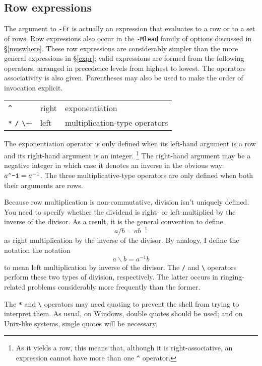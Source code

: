\documentclass[a4paper,11pt,oneside]{book}
\newcommand{\sref}[1]{\hyperref[#1]{\S\ref{#1}}}
\begin{document}
\subsection{Row expressions}\label{rowexpr}

The argument to \verb+-Fr+ is actually an expression%
 that evaluates to a row
or to a set of rows.  Row expressions also occur in the \verb+-Mlead+
family of options discussed in \sref{muswhere}.
These row expressions are considerably simpler than the more general 
expressions in \sref{expr}; 
valid expressions are formed from the following operators, 
arranged in precedence levels from 
highest to lowest.  The operators associativity
is also given.  Parentheses may also be used to make the order of invocation
explicit.

\begin{tabular}{l@{\quad}l@{\quad}l}
\verb+^+&                   right& exponentiation\\
\verb+*+ \verb+/+ \verb+\+& left&  multiplication-type operators\\
\end{tabular}

The exponentiation operator is only defined when its 
left-hand argument is a row and its right-hand argument is an integer.%
\footnote{As it yields a row, this means that, although it is 
right-associative, an expression cannot have more than one \verb+^+ operator.}
The right-hand argument may be a negative integer in which case it denotes
an inverse in the obvious way: $\hbox{$a$\verb+^-1+} = a^{-1}$.
The three multiplicative-type operators are only defined when both their
arguments are rows.

Because row multiplication is non-commutative, 
division isn't uniquely defined.  
You need to specify whether the dividend is right- or
left-multiplied by the inverse of the divisor.  As a result, it is the
general convention to define
\[ a/b = a b^{-1} \]
as right multiplication by the inverse of the divisor.  By analogy, I 
define the notation the notation
\[  a\backslash b = a^{-1} b \]
to mean left multiplication by inverse of the divisor.  The \verb+/+ and
\verb+\+ operators perform these two types of division, respectively.
The latter occurs in ringing-related problems considerably more frequently 
than the former.

The \verb+*+ and \verb+\+ operators may need quoting
to prevent the shell from trying to interpret them.  As usual, on Windows, 
double quotes should be used; and on Unix-like systems, single quotes will 
be necessary.
\end{document}
